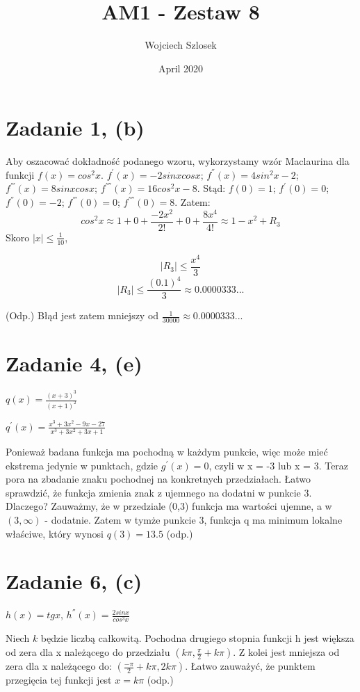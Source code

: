 \documentclass{article}
\title{AM1 - Zestaw 8}
\author{Wojciech Szlosek}
\date{April 2020}
\begin{document}
\maketitle

\section{Zadanie 1, (b)}

Aby oszacować dokładność podanego wzoru, wykorzystamy wzór Maclaurina dla funkcji $f(x) = cos^{2}x$. $f^{'} (x) = -2sinxcosx$; $f^{''} (x) = 4sin^2 x - 2$; $f^{'''}(x) = 8sinxcosx$; $f^{''''}(x) = 16cos^{2}x - 8$. Stąd: $f(0) = 1$; $f^{'} (0) = 0$; $f^{''} (0) = -2$; $f^{'''}(0) = 0$; $f^{''''}(0) = 8$.
\newline
Zatem:
$$cos^{2}x \approx 1+0+\frac{-2x^2}{2!}+0+\frac{8x^4}{4!} \approx 1-x^2+R_3$$
Skoro $|x| \leq \frac{1}{10}$, 

$$|R_3| \leq \frac{x^4}{3}$$
$$|R_3| \leq \frac{(0.1)^4}{3} \approx 0.0000333...$$

(Odp.) Błąd jest zatem mniejszy od $\frac{1}{30000} \approx 0.0000333...$

\section{Zadanie 4, (e)}

$q(x) = \frac{(x+3)^3}{(x+1)^2}$ \newline

$q^{'}(x) = \frac{x^3 +3x^2 -9x -27}{x^3 +3x^2 +3x +1}$ \newline

Ponieważ badana funkcja ma pochodną w każdym punkcie, więc może mieć ekstrema jedynie w punktach, gdzie $g^{'}(x) = 0$, czyli w x = -3 lub x = 3. Teraz pora na zbadanie znaku pochodnej na konkretnych przedziałach. Łatwo sprawdzić, że funkcja zmienia znak z ujemnego na dodatni w punkcie 3. Dlaczego? Zauważmy, że w przedziale (0,3) funkcja ma wartości ujemne, a w $(3, \infty)$ - dodatnie. Zatem w tymże punkcie 3, funkcja q ma minimum lokalne właściwe, który wynosi $q(3) = 13.5$ (odp.)

\section{Zadanie 6, (c)}

$h(x) = tg x$, $h^{''}(x) = \frac{2sinx}{cos^3 x}$
\newline

Niech $k$ będzie liczbą całkowitą. Pochodna drugiego stopnia funkcji h jest większa od zera dla x należącego do przedziału $(k\pi, \frac{\pi}{2}+k\pi)$. Z kolei jest mniejsza od zera dla x należącego do: $(\frac{-\pi}{2}+k\pi,2k\pi)$. 
\newline
Łatwo zauważyć, że punktem przegięcia tej funkcji jest $x = k\pi$ (odp.)
\end{document}
